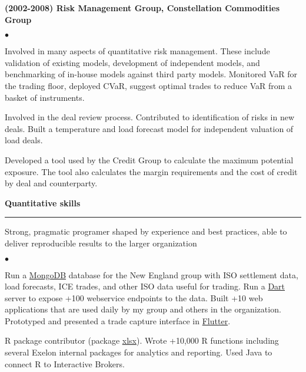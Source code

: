 \documentclass[11pt]{article}
\begin{document}
\noindent
{\bf (2002-2008) Risk Management Group, Constellation Commodities Group} 
\begin{list}{$\bullet$}
   {\setlength{\itemsep}{0ex}
     \setlength{\parsep}{1ex}}
   
  \item Involved in many aspects of quantitative risk management.
    These include validation of existing models, development of
    independent models, and benchmarking of in-house models against
    third party models. Monitored VaR for the trading floor, deployed
    CVaR, suggest optimal trades to reduce VaR from a basket of
    instruments.
    
  \item Involved in the deal review process.  Contributed to
    identification of risks in new deals.  Built a temperature and
    load forecast model for independent valuation of load deals.    

  \item Developed a tool used by the Credit Group to calculate the
    maximum potential exposure.  The tool also calculates the margin
    requirements and the cost of credit by deal and counterparty.

\end{list}

\noindent
\large\textsf{\textbf {Quantitative skills}}

\vspace*{-8pt}
\noindent
\rule{165mm}{0.25mm}
\normalfont\normalsize

\noindent
Strong, pragmatic programer shaped by experience and best practices,
able to deliver reproducible results to the larger organization
    
\vspace*{-4pt}
\begin{list}{$\bullet$}
   {\setlength{\itemsep}{0ex}
     \setlength{\parsep}{1ex}}
  \item Run a \href{https://www.mongodb.com/}{MongoDB} database for
    the New England group with ISO settlement data, load forecasts,
    ICE trades, and other ISO data useful for trading.  Run a
    \href{https://dart.dev/}{Dart} server to expose +100 webservice
    endpoints to the data.  Built +10 web applications that are used
    daily by my group and others in the organization.  Prototyped and
    presented a trade capture interface in
    \href{https://flutter.dev/}{Flutter}.

  \item R package contributor (package
    \href{https://cran.r-project.org/web/packages/xlsx/index.html}{xlsx}).
    Wrote +10,000 R functions including several Exelon internal
    packages for analytics and reporting.  Used Java to connect R to
    Interactive Brokers.
        
\end{list}
\end{document}
